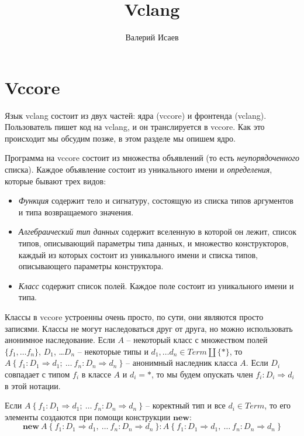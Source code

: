 \documentclass{amsart}
\theoremstyle{definition}
\theoremstyle{remark}
\newcommand{\red}{\Rightarrow}
\numberwithin{figure}{section}
\begin{document}
\title{Vclang}

\author{Валерий Исаев}


\maketitle

\section{Vccore}

Язык vclang состоит из двух частей: ядра (vccore) и фронтенда (vclang).
Пользователь пишет код на vclang, и он транслируется в vccore.
Как это происходит мы обсудим позже, в этом разделе мы опишем ядро.

Программа на vccore состоит из множества объявлений (то есть \emph{неупорядоченного} списка).
Каждое объявление состоит из уникального имени и \emph{определения}, которые бывают трех видов:
\begin{itemize}
\item \emph{Функция} содержит тело и сигнатуру, состоящую из списка типов аргументов и типа возвращаемого значения.
\item \emph{Алгебраический тип данных} содержит вселенную в которой он лежит, список типов, описывающий параметры типа данных, и множество конструкторов, каждый из которых состоит из уникального имени и списка типов, описывающего параметры конструктора.
\item \emph{Класс} содержит список полей. Каждое поле состоит из уникального имени и типа.
\end{itemize}
Классы в vccore устроенны очень просто, по сути, они являются просто записями.
Классы не могут наследоваться друг от друга, но можно использовать анонимное наследование.
Если $A$ -- некоторый класс с множеством полей $\{ f_1, \ldots f_n \}$, $D_1$, \ldots $D_n$ -- некоторые типы и $d_1, \ldots d_n \in Term \amalg \{ * \}$, то $A\ \{\ f_1 : D_1 \red d_1;\ \ldots\ f_n : D_n \red d_n\ \}$ -- анонимный наследник класса $A$.
Если $D_i$ совпадает с типом $f_i$ в классе $A$ и $d_i = *$, то мы будем опускать член $f_i : D_i \red d_i$ в этой нотации.

Если $A\ \{\ f_1 : D_1 \red d_1;\ \ldots\ f_n : D_n \red d_n\ \}$ -- коректный тип и все $d_i \in Term$, то его элементы создаются при помощи конструкции $\mathbf{new}$:
\[ \mathbf{new}\ A\ \{\ f_1 : D_1 \red d_1,\ \ldots\ f_n : D_n \red d_n\ \} : A\ \{\ f_1 : D_1 \red d_1,\ \ldots\ f_n : D_n \red d_n\ \} \]
\end{document}
